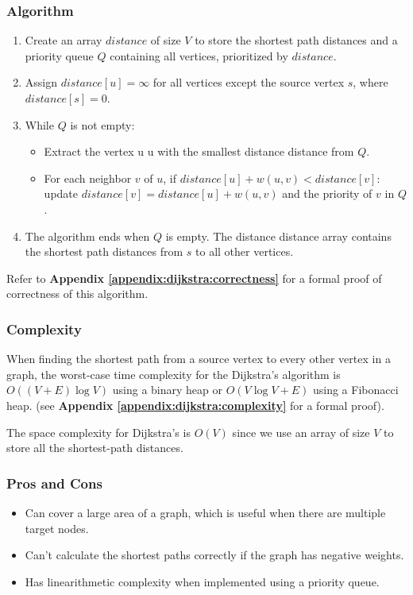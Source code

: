 		\subsubsection{Algorithm}
		\begin{enumerate}
			\item Create an array $distance$ of size $V$ to store the shortest path distances and a priority queue $Q$ containing all vertices, prioritized by $distance$.
			\item Assign $distance[u] = \infty$ for all vertices except the source vertex $s$, where $distance[s] = 0$.
			\item While $Q$ is not empty:
				\begin{itemize}
					\item Extract the vertex u u with the smallest distance distance from $Q$.
					\item For each neighbor $v$ of $u$, if $distance[u] + w(u,v) < distance[v]$: update $distance[v]=distance[u]+w(u,v)$ and the priority of $v$ in $Q$.
				\end{itemize}
			\item The algorithm ends when $Q$ is empty. The distance distance array contains the shortest path distances from $s$ to all other vertices.
		\end{enumerate}
			Refer to \textbf{Appendix \ref{appendix:dijkstra:correctness}} for a formal proof of correctness of this algorithm.
		\subsubsection{Complexity}
			When finding the shortest path from a source vertex to every other vertex in a graph, the worst-case time complexity for the Dijkstra's algorithm is $O((V+E)\log{V})$ using a binary heap or $O(V\log{V}+E)$ using a Fibonacci heap. (see \textbf{Appendix \ref{appendix:dijkstra:complexity}} for a formal proof). \medskip
			
			The space complexity for Dijkstra's is $O(V)$ since we use an array of size $V$ to store all the shortest-path distances.
		\subsubsection{Pros and Cons}
		\begin{itemize}
			\item Can cover a large area of a graph, which is useful when there are multiple target nodes.
			\item Can't calculate the shortest paths correctly if the graph has negative weights.
			\item Has linearithmetic complexity when implemented using a priority queue.
		\end{itemize}

